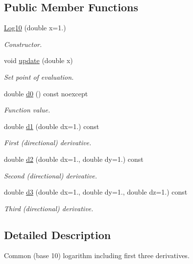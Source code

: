 \subsection*{Public Member Functions}
\begin{DoxyCompactItemize}
\item 
\hyperlink{structfuncy_1_1Log10_a2f91337c59f5ce826bb3428ef32e1c48}{Log10} (double x=1.)
\begin{DoxyCompactList}\small\item\em Constructor. \end{DoxyCompactList}\item 
void \hyperlink{structfuncy_1_1Log10_ac2321473b899d63ce704b4aa76f2130f}{update} (double x)
\begin{DoxyCompactList}\small\item\em Set point of evaluation. \end{DoxyCompactList}\item 
double \hyperlink{structfuncy_1_1Log10_a3ad280ee648c2e454e5f31166d2459f9}{d0} () const noexcept
\begin{DoxyCompactList}\small\item\em Function value. \end{DoxyCompactList}\item 
double \hyperlink{structfuncy_1_1Log10_a585c92357700947043f943b05297ccdc}{d1} (double dx=1.) const 
\begin{DoxyCompactList}\small\item\em First (directional) derivative. \end{DoxyCompactList}\item 
double \hyperlink{structfuncy_1_1Log10_a638950333d8f29d0fe7c763dc5d3bdc2}{d2} (double dx=1., double dy=1.) const 
\begin{DoxyCompactList}\small\item\em Second (directional) derivative. \end{DoxyCompactList}\item 
double \hyperlink{structfuncy_1_1Log10_a770b5d4a6f599bf510423515fd9dcbb4}{d3} (double dx=1., double dy=1., double dz=1.) const 
\begin{DoxyCompactList}\small\item\em Third (directional) derivative. \end{DoxyCompactList}\end{DoxyCompactItemize}


\subsection{Detailed Description}
Common (base 10) logarithm including first three derivatives. 

